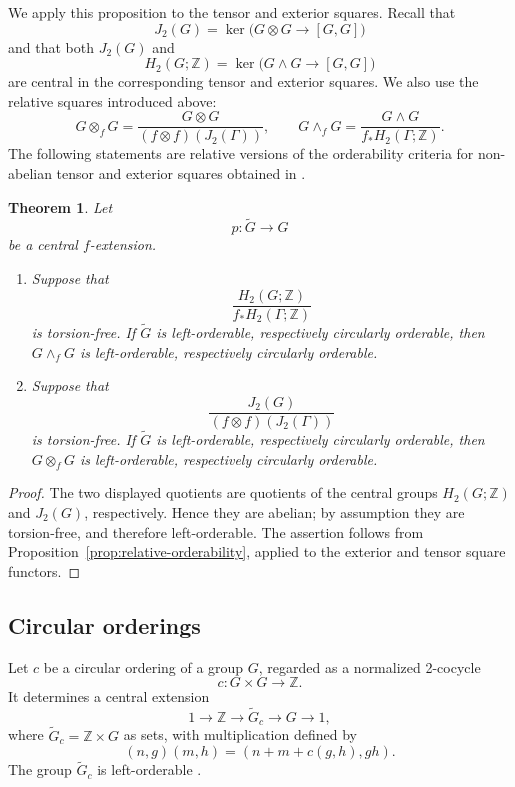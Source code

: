 \documentclass[10pt]{amsart}
\newtheorem{theorem}{Theorem}[section]
\renewcommand{\*}{\cdot {\dots} \cdot}
\newcommand{\?}[1]{\overset{?}{#1}}
\numberwithin{equation}{section}
\begin{document}
We apply this proposition to the tensor and exterior squares.
Recall that
\[
J_2(G)=\ker\bigl(G\otimes G\longrightarrow[G,G]\bigr)
\]
and that both $J_2(G)$ and
\[
H_2(G;\mathbb Z)
=
\ker\bigl(G\wedge G\longrightarrow[G,G]\bigr)
\]
are central in the corresponding tensor and exterior squares. We
also use the relative squares introduced above:
\[
G\otimes_fG
=
\frac{G\otimes G}{(f\otimes f)(J_2(\Gamma))},
\qquad
G\wedge_fG
=
\frac{G\wedge G}{f_*H_2(\Gamma;\mathbb Z)}.
\]
The following statements are relative versions of the
orderability criteria for non-abelian tensor and exterior
squares obtained in \cite{Ivanov2024}.
\begin{theorem}\label{thm:relative-squares-orderability}
Let
\[
p\colon\widetilde G\longrightarrow G
\]
be a central $f$-extension.

\begin{enumerate}
\item Suppose that
\[
\frac{H_2(G;\mathbb Z)}
     {f_*H_2(\Gamma;\mathbb Z)}
\]
is torsion-free. If $\widetilde G$ is left-orderable,
respectively circularly orderable, then $G\wedge_f G$ is
left-orderable, respectively circularly orderable.

\item Suppose that
\[
\frac{J_2(G)}
     {(f\otimes f)(J_2(\Gamma))}
\]
is torsion-free. If $\widetilde G$ is left-orderable,
respectively circularly orderable, then $G\otimes_f G$ is
left-orderable, respectively circularly orderable.
\end{enumerate}
\end{theorem}

\begin{proof}
The two displayed quotients are quotients of the central groups
$H_2(G;\mathbb Z)$ and $J_2(G)$, respectively. Hence they are
abelian; by assumption they are torsion-free, and therefore
left-orderable. The assertion follows from
Proposition~\ref{prop:relative-orderability}, applied to the
exterior and tensor square functors.
\end{proof}

\subsection{Circular orderings}

Let $c$ be a circular ordering of a group $G$, regarded as a
normalized 2-cocycle
\[
c\colon G\times G\longrightarrow\mathbb Z.
\]
It determines a central extension
\[
1\longrightarrow\mathbb Z
\longrightarrow\widetilde G_c
\longrightarrow G
\longrightarrow1,
\]
where
$
\widetilde G_c=\mathbb Z\times G
$ as sets,
with multiplication defined by
\[
(n,g)(m,h)=(n+m+c(g,h),gh).
\]
The group $\widetilde G_c$ is left-orderable
\cite{ClayGhaswala2021}.
\end{document}
